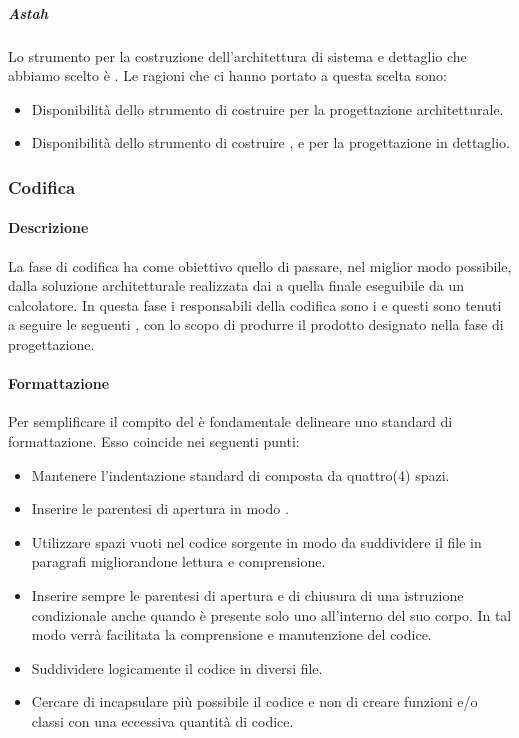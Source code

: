 \subparagraph{Astah}
Lo strumento per la costruzione dell'architettura di sistema e dettaglio che abbiamo scelto è .
Le ragioni che ci hanno portato a questa scelta sono:
\begin{itemize}
\item Disponibilità dello strumento di costruire  per la progettazione architetturale.
\item Disponibilità dello strumento di costruire ,  e  per la progettazione in dettaglio.
\end{itemize}

\subsubsection{Codifica}
\paragraph{Descrizione}
La fase di codifica ha come obiettivo quello di passare, nel miglior modo possibile, dalla soluzione architetturale realizzata dai \textit{\ProgP} a quella finale eseguibile da un calcolatore.
In questa fase i responsabili della codifica sono i \textit{\ProgrP} e questi sono tenuti a seguire le seguenti , con lo scopo di produrre il prodotto designato nella fase di progettazione.

\paragraph{Formattazione}
Per semplificare il compito del \textit{\Progr} è fondamentale delineare uno standard di formattazione.
Esso coincide nei seguenti punti:

\begin{itemize}
\item Mantenere l'indentazione standard di  composta da quattro(4) spazi.

\item Inserire le parentesi di apertura in modo .

\item Utilizzare spazi vuoti nel codice sorgente in modo da suddividere il file in paragrafi migliorandone lettura e comprensione.

\item Inserire sempre le parentesi di apertura e di chiusura di una istruzione condizionale anche quando è presente solo uno  all'interno del suo corpo. In tal modo verrà facilitata la comprensione e manutenzione del codice.

\item Suddividere logicamente il codice in diversi file.

\item Cercare di incapsulare più possibile il codice e non di creare funzioni e/o classi con una eccessiva quantità di codice.
\end{itemize}


